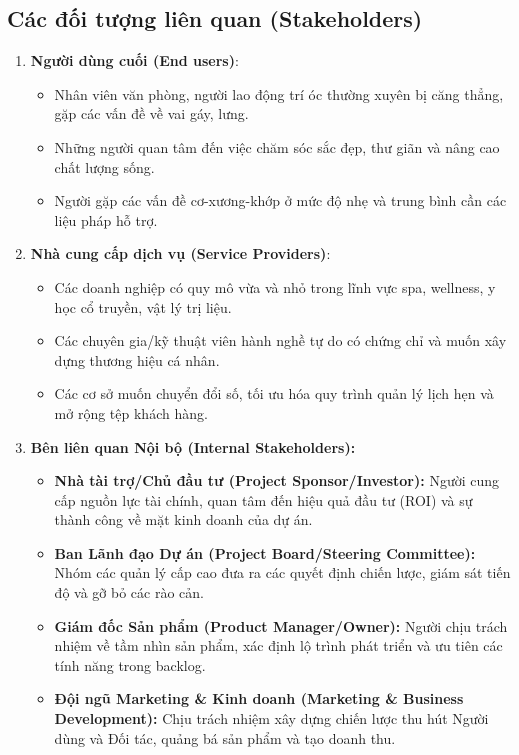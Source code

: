 \subsection{Các đối tượng liên quan (Stakeholders)}
\begin{enumerate}
    \item \textbf{Người dùng cuối (End users)}: 
    \begin{itemize}
        \item Nhân viên văn phòng, người lao động trí óc thường xuyên bị căng thẳng, gặp các vấn đề về vai gáy, lưng.
        \item Những người quan tâm đến việc chăm sóc sắc đẹp, thư giãn và nâng cao chất lượng sống.
        \item Người gặp các vấn đề cơ-xương-khớp ở mức độ nhẹ và trung bình cần các liệu pháp hỗ trợ.
    \end{itemize}
    \item \textbf{Nhà cung cấp dịch vụ (Service Providers)}: 
    \begin{itemize}
        \item Các doanh nghiệp có quy mô vừa và nhỏ trong lĩnh vực spa, wellness, y học cổ truyền, vật lý trị liệu.
        \item Các chuyên gia/kỹ thuật viên hành nghề tự do có chứng chỉ và muốn xây dựng thương hiệu cá nhân.
        \item Các cơ sở muốn chuyển đổi số, tối ưu hóa quy trình quản lý lịch hẹn và mở rộng tệp khách hàng.
    \end{itemize}
    \item \textbf{ Bên liên quan Nội bộ (Internal Stakeholders):}
    \begin{itemize}
        \item \textbf{Nhà tài trợ/Chủ đầu tư (Project Sponsor/Investor):} Người cung cấp nguồn lực tài chính, quan tâm đến hiệu quả đầu tư (ROI) và sự thành công về mặt kinh doanh của dự án.
        \item \textbf{Ban Lãnh đạo Dự án (Project Board/Steering Committee):} Nhóm các quản lý cấp cao đưa ra các quyết định chiến lược, giám sát tiến độ và gỡ bỏ các rào cản.
        \item \textbf{Giám đốc Sản phẩm (Product Manager/Owner):} Người chịu trách nhiệm về tầm nhìn sản phẩm, xác định lộ trình phát triển và ưu tiên các tính năng trong backlog.
        \item \textbf{Đội ngũ Marketing \& Kinh doanh (Marketing \& Business Development):} Chịu trách nhiệm xây dựng chiến lược thu hút Người dùng và Đối tác, quảng bá sản phẩm và tạo doanh thu.


\end{itemize}
\end{enumerate}
